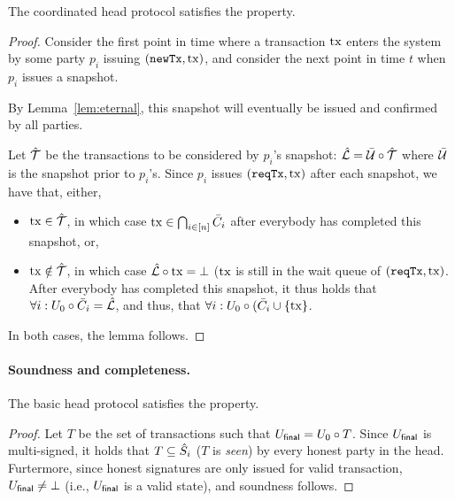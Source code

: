 \begin{lemma}
  \label{lem:liveness}
  The coordinated head protocol satisfies the  property.
\end{lemma}
\begin{proof}
  Consider the first point in time where a transaction $\mathrm{tx}$ enters the system by some party $p_i$
  issuing $(\mathtt{newTx},\mathrm{tx})$, and consider the next point in time
  $t$ when $p_i$ issues a snapshot.

  By Lemma~\ref{lem:eternal}, this snapshot will eventually be issued and confirmed by all parties.
  
  \medskip
  
  Let $\hat {\mathcal T}$ be the transactions to be considered by $p_i$'s snapshot: $\hat {\mathcal L}=\bar {\mathcal U}\circ\hat {\mathcal T}$
  where $\bar {\mathcal U}$ is the snapshot prior to $p_i$'s. Since $p_i$ issues
  $(\mathtt{reqTx},\mathrm{tx})$ after each snapshot, we have that, either,
  \begin{itemize}
      \item $\mathrm{tx}\in\hat {\mathcal T}$, in which case $\mathrm{tx} \in \bigcap_{i\in[n]} \bar{C}_i$ after everybody has completed this snapshot, or,
      \item $\mathrm{tx}\notin\hat {\mathcal T}$, in which case $\hat {\mathcal L}\circ\mathrm{tx}=\bot$ ($\mathrm{tx}$ is still in the wait queue of $(\mathtt{reqTx},\mathrm{tx})$. After everybody has completed this snapshot, it thus holds that $\forall i: U_{0}\circ\bar{C}_i=\hat {\mathcal L}$, and thus, that
      $\forall i: U_{0}\circ(\bar{C}_i\cup\{\mathrm{tx}\}$.
  \end{itemize}
  In both cases, the lemma follows.
\end{proof}

\paragraph{Soundness and completeness.}

\begin{lemma}[Soundness]
  \label{lem:soundness}
  The basic head protocol satisfies the  property.
\end{lemma}

\begin{proof}
  Let $T$ be the set of transactions such that $U_{\mathsf{final}}=U_0\circ T$.
  Since $U_{\mathsf{final}}$ is multi-signed, it holds that $T\subseteq\hat{S}_i$
  ($T$ is \emph{seen}) by every honest party in the head.
  Furtermore, since honest signatures are only issued for valid transaction,
  $U_{\mathsf{final}}\not=\bot$ (i.e., $U_{\mathsf{final}}$ is a valid state), and soundness
  follows.
\end{proof}


